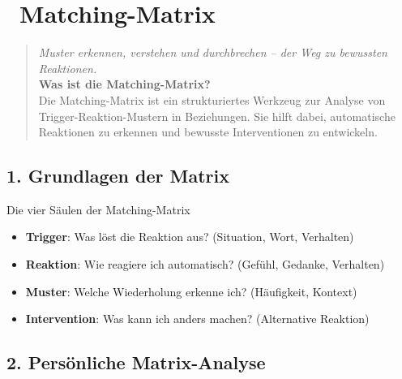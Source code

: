 
\newpage
\section*{\textcolor{ctmmPurple}{\faProjectDiagram~Matching-Matrix}}
\label{sec:matching-matrix}

\begin{quote}
\textit{\textcolor{ctmmPurple}{Muster erkennen, verstehen und durchbrechen -- der Weg zu bewussten Reaktionen.}}\\
\textbf{\textcolor{ctmmPurple}{Was ist die Matching-Matrix?}}\\
Die Matching-Matrix ist ein strukturiertes Werkzeug zur Analyse von Trigger-Reaktion-Mustern in Beziehungen. Sie hilft dabei, automatische Reaktionen zu erkennen und bewusste Interventionen zu entwickeln.
\end{quote}

\subsection*{\textcolor{ctmmPurple}{1. Grundlagen der Matrix}}

\begin{ctmmPurpleBox}{Die vier Säulen der Matching-Matrix}
\begin{itemize}
    \item \textbf{Trigger}: Was löst die Reaktion aus? (Situation, Wort, Verhalten)
    \item \textbf{Reaktion}: Wie reagiere ich automatisch? (Gefühl, Gedanke, Verhalten)
    \item \textbf{Muster}: Welche Wiederholung erkenne ich? (Häufigkeit, Kontext)
    \item \textbf{Intervention}: Was kann ich anders machen? (Alternative Reaktion)
\end{itemize}
\end{ctmmPurpleBox}

\subsection*{\textcolor{ctmmPurple}{2. Persönliche Matrix-Analyse}}

